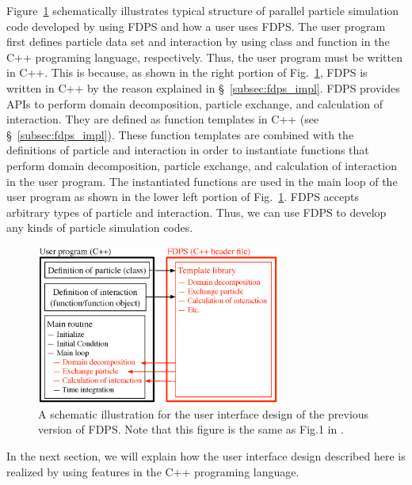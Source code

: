 \documentclass[twocolumn,useamsfonts]{pasj01}
\begin{document}
Figure~\ref{fig:fdps_ui} schematically illustrates typical structure of parallel particle simulation code developed by using FDPS and how a user uses FDPS. The user program first defines particle data set and interaction by using class and function in the C++ programing language, respectively. Thus, the user program must be written in C++. This is because, as shown in the right portion of Fig.~\ref{fig:fdps_ui}, FDPS is written in C++ by the reason explained in \S~\ref{subsec:fdps_impl}. FDPS provides APIs to perform domain decomposition, particle exchange, and calculation of interaction. They are defined as function templates in C++ (see \S~\ref{subsec:fdps_impl}). These function templates are combined with the definitions of particle and interaction in order to instantiate functions that perform domain decomposition, particle exchange, and calculation of interaction in the user program. The instantiated functions are used in the main loop of the user program as shown in the lower left portion of Fig.~\ref{fig:fdps_ui}. FDPS accepts arbitrary types of particle and interaction. Thus, we can use FDPS  to develop any kinds of particle simulation codes. 

\begin{figure}[h]
\begin{center}
\includegraphics[width=8cm]{figures/FDPS_UI}
\end{center}
\caption{A schematic illustration for the user interface design of the previous version of FDPS. Note that this figure is the same as Fig.1 in \citet{iwasawa16:_implem_fdps}.}
\label{fig:fdps_ui}  
\end{figure}

In the next section, we will explain how the user interface design described here is realized by using features in the C++ programing language.


\end{document}
